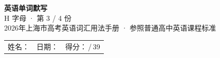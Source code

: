 \documentclass[10pt,a4paper]{article}
\begin{document}
\pagestyle{plain}

\begin{center}
{\LARGE\bfseries 英语单词默写}\\[0.22em]
{\large H 字母 · 第 3 / 4 份}\\[0.18em]
{\small 2026年上海市高考英语词汇用法手册 · 参照普通高中英语课程标准}
\end{center}

\vspace{0.25em}
\noindent\begin{tabular}{@{}p{}@{}p{}@{}p{}@{}}
姓名：\underline{\hspace{2.0cm}} & 日期：\underline{\hspace{2.0cm}} & 得分：\underline{\hspace{1.3cm}}\,/\,39 \\
\end{tabular}

\vspace{0.3em}

\vspace{0.08em}
\end{document}
